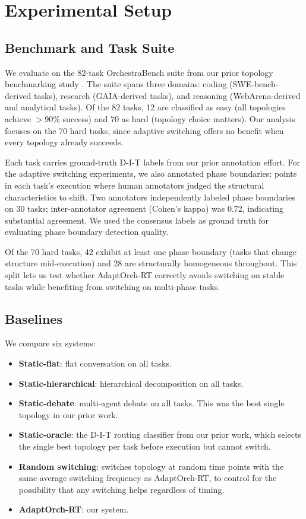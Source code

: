 \section{Experimental Setup}\label{experimental-setup}

\subsection{Benchmark and Task Suite}\label{benchmark-and-task-suite}

We evaluate on the 82-task OrchestraBench suite from our prior topology
benchmarking study \citep{anonymous_2026}. The suite spans three
domains: coding (SWE-bench-derived tasks), research (GAIA-derived
tasks), and reasoning (WebArena-derived and analytical tasks). Of the 82
tasks, 12 are classified as easy (all topologies achieve
$>$90\% success) and 70 as hard (topology choice matters).
Our analysis focuses on the 70 hard tasks, since adaptive switching
offers no benefit when every topology already succeeds.

Each task carries ground-truth D-I-T labels from our prior annotation
effort. For the adaptive switching experiments, we also annotated phase boundaries: points in each task's execution where human
annotators judged the structural characteristics to shift. Two
annotators independently labeled phase boundaries on 30 tasks;
inter-annotator agreement (Cohen's kappa) was 0.72, indicating
substantial agreement. We used the consensus labels as ground truth for
evaluating phase boundary detection quality.

Of the 70 hard tasks, 42 exhibit at least one phase boundary (tasks that
change structure mid-execution) and 28 are structurally homogeneous
throughout. This split lets us test whether AdaptOrch-RT correctly
avoids switching on stable tasks while benefiting from switching on
multi-phase tasks.

\subsection{Baselines}\label{baselines}

We compare six systems:

\begin{itemize}
\item \textbf{Static-flat}: flat conversation on all tasks.
\item \textbf{Static-hierarchical}: hierarchical decomposition on all tasks.
\item \textbf{Static-debate}: multi-agent debate on all tasks. This was the best single topology in our prior work.
\item \textbf{Static-oracle}: the D-I-T routing classifier from our prior work, which selects the single best topology per task before execution but cannot switch.
\item \textbf{Random switching}: switches topology at random time points with the same average switching frequency as AdaptOrch-RT, to control for the possibility that any switching helps regardless of timing.
\item \textbf{AdaptOrch-RT}: our system.
\end{itemize}

